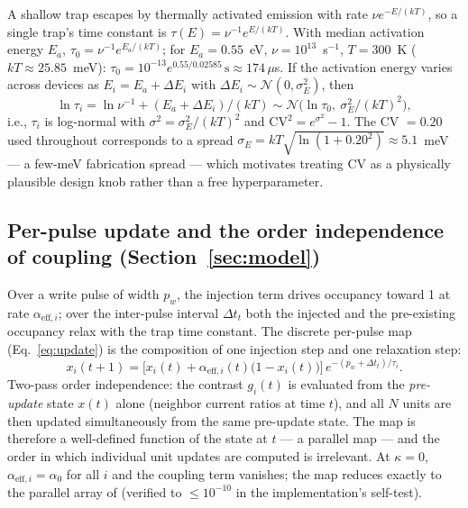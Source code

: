 \documentclass[11pt]{article}
\newcommand{\Dt}{\Delta t}
\begin{document}
A shallow trap escapes by thermally activated emission with rate
$\nu e^{-E/(kT)}$, so a single trap's time constant is
$\tau(E)=\nu^{-1}e^{E/(kT)}$. With median activation energy $E_a$,
$\tau_0=\nu^{-1}e^{E_a/(kT)}$; for $E_a=0.55$~eV, $\nu=10^{13}$~s$^{-1}$,
$T=300$~K ($kT\approx 25.85$~meV): $\tau_0=10^{-13}e^{0.55/0.02585}\,\text{s}
\approx 174\,\mu$s. If the activation energy varies across devices as
$E_i=E_a+\Delta E_i$ with $\Delta E_i\sim\mathcal{N}(0,\sigma_E^2)$, then
\begin{equation}
\ln\tau_i=\ln\nu^{-1}+(E_a+\Delta E_i)/(kT)\sim\mathcal{N}
\big(\ln\tau_0,\ \sigma_E^2/(kT)^2\big),
\label{eq:spectrum}
\end{equation}
i.e., $\tau_i$ is log-normal with $\sigma^2=\sigma_E^2/(kT)^2$ and
$\mathrm{CV}^2=e^{\sigma^2}-1$. The CV $=0.20$ used throughout corresponds to a
spread $\sigma_E=kT\sqrt{\ln(1+0.20^2)}\approx 5.1$~meV --- a few-meV
fabrication spread --- which motivates treating CV as a physically plausible
design knob rather than a free hyperparameter.

\subsection{Per-pulse update and the order independence of coupling (Section~\ref{sec:model})}
\label{app:update}

Over a write pulse of width $p_w$, the injection term drives occupancy toward 1
at rate $\alpha_{\mathrm{eff},i}$; over the inter-pulse interval $\Dt_t$ both
the injected and the pre-existing occupancy relax with the trap time constant.
The discrete per-pulse map (Eq.~\eqref{eq:update}) is the composition of one
injection step and one relaxation step:
\begin{equation}
x_i(t+1)=\Big[x_i(t)+\alpha_{\mathrm{eff},i}(t)\big(1-x_i(t)\big)\Big]\,
e^{-(p_w+\Dt_t)/\tau_i}.
\label{eq:update2}
\end{equation}
Two-pass order independence: the contrast $g_i(t)$ is evaluated from the
\emph{pre-update} state $x(t)$ alone (neighbor current ratios at time $t$), and
all $N$ units are then updated simultaneously from the same pre-update state.
The map is therefore a well-defined function of the state at $t$ --- a parallel
map --- and the order in which individual unit updates are computed is
irrelevant. At $\kappa=0$, $\alpha_{\mathrm{eff},i}=\alpha_0$ for all $i$ and
the coupling term vanishes; the map reduces exactly to the parallel array of
\cite{prior} (verified to $\le 10^{-10}$ in the implementation's self-test).
\end{document}
